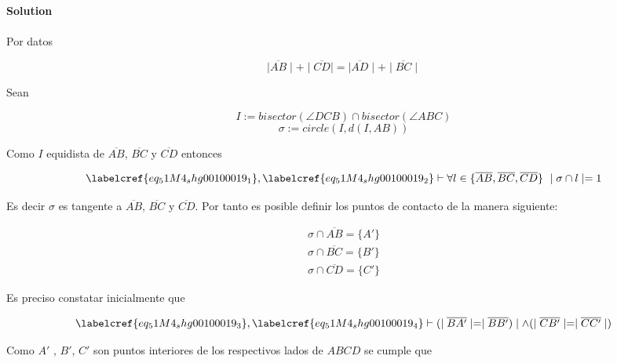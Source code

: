 
\noindent\textbf{Solution}\\\\

Por datos 

\begin{equation} \label{eq_51M4_shg00100019_0}
	\mid\overline{AB}\mid + \mid\overline{CD}\mid = \mid\overline{AD}\mid + \mid\overline{BC}\mid
\end{equation}

Sean

\begin{equation} \label{eq_51M4_shg00100019_1}
	I := bisector(\angle DCB) \cap bisector(\angle ABC)
\end{equation}
\begin{equation} \label{eq_51M4_shg00100019_2}
	\sigma := circle(I, d(I, AB))
\end{equation}

Como $I$ equidista de $\overline{AB}$, $\overline{BC}$ y $\overline{CD}$ entonces 

\begin{equation} \label{eq_51M4_shg00100019_3}
	\labelcref{eq_51M4_shg00100019_1}, \labelcref{eq_51M4_shg00100019_2} \vdash \forall l \in \{\overline{AB}, \overline{BC}, \overline{CD} \}\ \mid \sigma \cap l \mid = 1
\end{equation}

Es decir $\sigma$ es tangente a $\overline{AB}$, $\overline{BC}$ y $\overline{CD}$. Por tanto es posible definir los puntos de contacto de la manera siguiente:

\begin{equation} \label{eq_51M4_shg00100019_4}
\begin{gathered}
	\sigma \cap \overline{AB} = \{A'\} \\
	\sigma \cap \overline{BC} = \{B'\} \\
	\sigma \cap \overline{CD} = \{C'\}
\end{gathered}
\end{equation}

Es preciso constatar inicialmente que 

\begin{equation} \label{eq_51M4_shg00100019_5}
	\labelcref{eq_51M4_shg00100019_3}, \labelcref{eq_51M4_shg00100019_4} \vdash (\mid\overline{BA'}\mid = \mid\overline{BB'})\mid \land (\mid\overline{CB'}\mid = \mid\overline{CC'}\mid)
\end{equation}

Como $A'$ , $B'$, $C'$ son puntos interiores de los respectivos lados de $ABCD$ se cumple que

